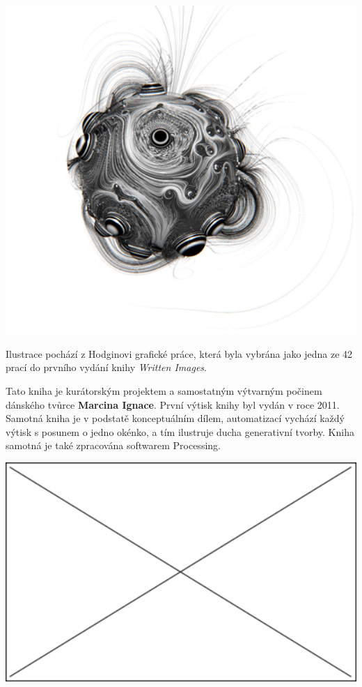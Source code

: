 \documentclass[10pt]{book}
\begin{document}
\vfill
\begin{centering}
\includegraphics[width = 1\textwidth]{imgs/hogin.png}
\end{centering}

Ilustrace pochází z Hodginovi grafické práce, která byla vybrána jako jedna ze 42 prací do prvního vydání knihy {\em Written Images}.

Tato kniha je kurátorským projektem a samostatným výtvarným počinem dánského tvůrce \textbf{Marcina Ignace}. První výtisk knihy byl vydán v roce 2011. Samotná kniha je v podstatě konceptuálním dílem, automatizací vychází každý výtisk s posunem o jedno okénko, a tím ilustruje ducha generativní tvorby. Kniha samotná je také zpracována softwarem Processing. \vfill

\begin{centering}
\includegraphics[width = 1\textwidth]{imgs/neznamy.png}

\end{centering}
\end{document}
